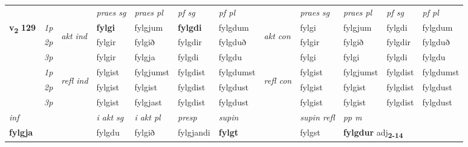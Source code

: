 \begin{longtable}[l]{X>{\footnotesize\itshape}llXXXXlXXXX}
 & &   & \textit{praes sg}  & \textit{praes pl}    & \textit{ pf sg} & \textit{pf pl} & & \textit{praes sg}  & \textit{praes pl}    & \textit{pf sg} & \textit{pf pl }  \\ \cmidrule{4-7} \cmidrule{9-12}
 \multirow{2}{*}{{{\textbf{v{\textsubscript{2}}} \Large{\textbf{129}}}}}  & 1p & \multirow{3}{*}{\begin{turn}{90}\textit{akt ind}\end{turn}} & \textbf{fylgi} & fylgjum & \textbf{fylgdi} & fylgdum & \multirow{3}{*}{\begin{turn}{90}\textit{akt con}\end{turn}} &fylgi & fylgjum & fylgdi & fylgdum\\*
 & 2p &  &  fylgir  & fylgið & fylgdir & fylgduð & & fylgir & fylgið & fylgdir & fylgduð \\*
 & 3p &  & fylgir & fylgja & fylgdi & fylgdu & & fylgi & fylgi& fylgdi & fylgdu \\*
\cmidrule{4-7} \cmidrule{9-12}
 & 1p & \multirow{3}{*}{\begin{turn}{90}\textit{refl ind}\end{turn}}  & fylgist & fylgjumst & fylgdist & fylgdumst & \multirow{3}{*}{\begin{turn}{90}\textit{refl con}\end{turn}}  &fylgist & fylgjumst & fylgdist & fylgdumst \\*
 & 2p &  & fylgist & fylgist & fylgdist & fylgdust & &fylgist & fylgist & fylgdist & fylgdust \\*
 & 3p  & & fylgist & fylgjast & fylgdist & fylgdust & & fylgist & fylgist& fylgdist & fylgdust \\*
\cmidrule{4-7} \cmidrule{9-12}

   {\textit{inf}} & &  & \textit{i akt sg} & \textit{i akt pl}   & \textit{presp} & \textit{supin} && \textit{supin refl} & \textit{pp m} \\*
  {\textbf{fylgja}} & && fylgdu  & fylgið   & fylgjandi &  \textbf{fylgt} && fylgst & \multicolumn{2}{l}{\textbf{fylgdur} adj\textbf{\textsubscript{2-14}}} \\*

\midrule


\end{longtable}
